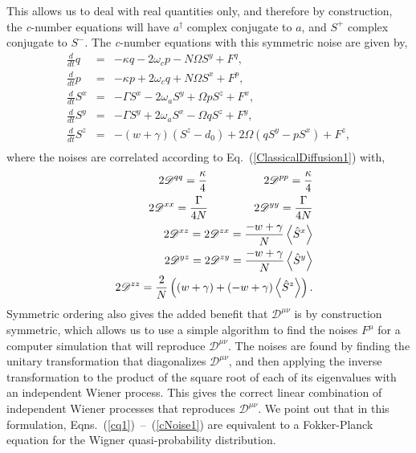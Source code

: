 \documentclass[aps,
twocolumn,
superscriptaddress,groupedaddress]{revtex4}
\begin{document}
This allows us to deal with real quantities only, and therefore by
construction, the {\it c}-number equations will have $a^{\dagger}$ complex
conjugate to $a$, and $S^+$  complex conjugate to $S^-$.
The {\it c}-number equations with this symmetric noise are given by,
\begin{eqnarray}
\frac{d}{dt} q &=& -\kappa q - 2 \omega_c p - N \Omega S^{y} + F^{q},
\label{cq1}
\\
\frac{d}{dt} p&=& -\kappa p + 2 \omega_c q + N \Omega S^{x} + F^{p},
\\
\frac{d}{dt} S^{x} &=&
-\Gamma S^{x}  - 2 \omega_a S^{y} + \Omega p S^{z} + F^{x},
\\
\frac{d}{dt} S^{y} &=&
-\Gamma S^{y}  + 2 \omega_a S^{x} - \Omega q S^{z} + F^{y},
\\
\frac{d}{dt} S^{z} &=& -(w+\gamma)\left( S^{z} - d_0\right)
+2 \Omega \left( q S^{y} - p S^{x} \right)
+F^{z},
\nonumber
\\
\end{eqnarray}
where the noises are correlated according to Eq.~(\ref{ClassicalDiffusion1}) with,
\begin{eqnarray}
&& 2\mathscr{D}^{q q}=
\frac{\kappa}{4} \hspace{0.7in} 2\mathscr{D}^{p p}=
\frac{\kappa}{4} \nonumber \\
&& 2\mathscr{D}^{xx}=
\frac{\Gamma}{4N} \hspace{0.57in} 2\mathscr{D}^{yy}=
\frac{\Gamma}{4N} \nonumber \\
&& 2\mathscr{D}^{xz}=
2\mathscr{D}^{zx}=
\frac{-w+\gamma}{N} \left< \hat{S}^{x} \right>  \nonumber \\
&& 2\mathscr{D}^{yz}=
2\mathscr{D}^{zy}=
\frac{-w+\gamma}{N} \left< \hat{S}^{y} \right>  \nonumber \\
&& 2\mathscr{D}^{zz}=
\frac{2}{N}\left((w+\gamma) + (-w+\gamma)  \left< \hat{S}^{z} \right> \right).
\label{cNoise1}
\end{eqnarray}
Symmetric ordering also gives the added benefit that $\mathscr{D}^{\mu
\nu}$ is by construction symmetric, which allows us to use a simple
algorithm to find the noises $F^\mu$ for a computer simulation that will
reproduce $\mathscr{D}^{\mu \nu}$.  The noises are found by finding the
unitary transformation that diagonalizes $\mathscr{D}^{\mu \nu}$, and
then applying the inverse transformation to the product of the square
root of each of its eigenvalues with an independent Wiener process. This
gives the correct linear combination of independent Wiener processes
that reproduces $\mathscr{D}^{\mu \nu}$.
We point out that in this formulation, Eqns.~(\ref{cq1})~--~(\ref{cNoise1}) are equivalent to a Fokker-Planck
equation for the Wigner quasi-probability distribution.
\end{document}
